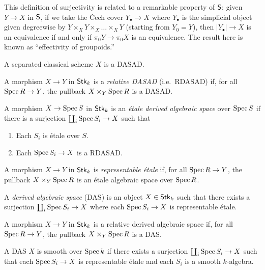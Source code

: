 \documentclass{amsart}
\begin{document}
\begin{rmk}
	This definition of surjectivity is related to a remarkable property of $\mathsf{S}$: given $Y \to X$ in $\mathsf{S}$, if we take the \v{C}ech cover $Y_\bullet \to X$ where $Y_\bullet$ is the simplicial object given degreewise by $Y \times_X Y \times_X \dots \times_X Y$ (starting from $Y_0 = Y$), then $|Y_\bullet| \to X$ is an equivalence if and only if $\pi_0 Y \to \pi_0 X$ is an equivalence.
	The result here is known as ``effectivity of groupoids.''
\end{rmk}

\begin{ex}
	A separated classical scheme $X$ is a DASAD.
\end{ex}

\begin{dfn}
	A morphism $X \to Y$ in $\mathsf{Stk}_k$ is a \emph{relative DASAD} (i.e.\ RDASAD) if, for all $\operatorname{Spec} R \to Y$, the pullback $X \times_Y \operatorname{Spec} R$ is a DASAD.
\end{dfn}

\begin{dfn}
	A morphism $X \to \operatorname{Spec} S$ in $\mathsf{Stk}_k$ is an \emph{\'etale derived algebraic space} over $\operatorname{Spec} S$ if there is a surjection $\coprod_i \operatorname{Spec} S_i \to X$ such that
	\begin{enumerate}
		\item Each $S_i$ is \'etale over $S$.
		\item Each $\operatorname{Spec} S_i \to X$ is a RDASAD.
	\end{enumerate}
\end{dfn}

\begin{dfn}
	A morphism $X \to Y$ in $\mathsf{Stk}_k$ is \emph{representable \'etale} if, for all $\operatorname{Spec} R \to Y$, the pullback $X \times_Y \operatorname{Spec} R$ is an \'etale algebraic space over $\operatorname{Spec} R$.
\end{dfn}

\begin{dfn}
	A \emph{derived algebraic space} (DAS) is an object $X \in \mathsf{Stk}_k$ such that there exists a surjection $\coprod_i \operatorname{Spec} S_i \to X$ where each $\operatorname{Spec} S_i \to X$ is representable \'etale.
\end{dfn}

\begin{dfn}
	A morphism $X \to Y$ in $\mathsf{Stk}_k$ is a relative derived algebraic space if, for all $\operatorname{Spec} R \to Y$, the pullback $X \times_Y \operatorname{Spec} R$ is a DAS.
\end{dfn}

\begin{dfn}
	A DAS $X$ is smooth over $\operatorname{Spec} k$ if there exists a surjection $\coprod_i \operatorname{Spec} S_i \to X$ such that each $\operatorname{Spec} S_i \to X$ is representable \'etale and each $S_i$ is a smooth $k$-algebra.
\end{dfn}
\end{document}
